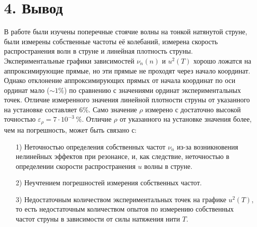 \documentclass[a4paper]{article}
\begin{document}
\section*{4. Вывод}
В работе были изучены поперечные стоячие волны на тонкой натянутой струне, были измерены собственные частоты её колебаний, измерена скорость распространения волн в струне и линейная плотность струны. Экспериментальные графики зависимостей $\nu_n(n)$ и $u^2(T)$ хорошо ложатся на аппроксимирующие прямые, но эти прямые не проходят через начало координат. Однако отклонение аппроксимирующих прямых от начала координат по оси ординат мало ($\sim 1\%$) по сравнению с значениями ординат экспериментальных точек. Отличие измеренного значения линейной плотности струны от указанного на установке составляет $6 \%$. Само значение $\rho$ измерено с достаточно высокой точностью $\varepsilon_{\rho} = 7 \cdot 10^{-3} \ \%$. Отличие $\rho$ от указанного на установке значения более, чем на погрешность, может быть связано с:
\begin{itemize}
\item[1) ] Неточностью определения собственных частот $\nu_n$ из-за возникновения нелинейных эффектов при резонансе, и, как следствие, неточностью в определении скорости распространения $u$ волны в струне.
\item[2) ] Неучтением погрешностей измерения собственных частот.
\item[3) ] Недостаточным количеством экспериментальных точек на графике $u^2(T)$, то есть недостаточным количеством опытов по измерению собственных частот струны в зависимости от силы натяжения нити $T$.
\end{itemize}
\end{document}
